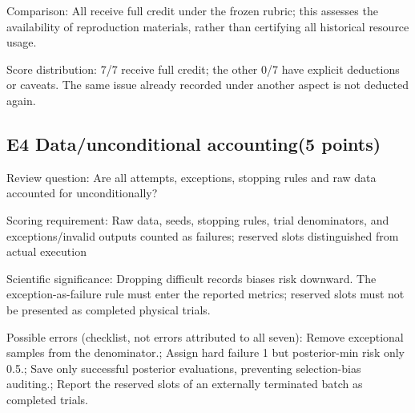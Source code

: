 \documentclass[11pt,a4paper]{article}
\begin{document}
Comparison: All receive full credit under the frozen rubric; this assesses the availability of reproduction materials,\allowbreak{} rather than certifying all historical resource usage.

Score distribution: 7/\allowbreak{}7 receive full credit; the other 0/\allowbreak{}7 have explicit deductions or caveats. The same issue already recorded under another aspect is not deducted again.

\clearpage
\subsection{E4 Data/\allowbreak{}unconditional accounting(5 points)}
\label{aspect:E4}
Review question: Are all attempts,\allowbreak{} exceptions,\allowbreak{} stopping rules and raw data accounted for unconditionally?

Scoring requirement: Raw data,\allowbreak{} seeds,\allowbreak{} stopping rules,\allowbreak{} trial denominators,\allowbreak{} and exceptions/\allowbreak{}invalid outputs counted as failures; reserved slots distinguished from actual execution

Scientific significance: Dropping difficult records biases risk downward. The exception-as-failure rule must enter the reported metrics; reserved slots must not be presented as completed physical trials.

Possible errors (checklist,\allowbreak{} not errors attributed to all seven): Remove exceptional samples from the denominator.; Assign hard failure 1 but posterior-min risk only 0.5.; Save only successful posterior evaluations,\allowbreak{} preventing selection-bias auditing.; Report the reserved slots of an externally terminated batch as completed trials.
\end{document}
